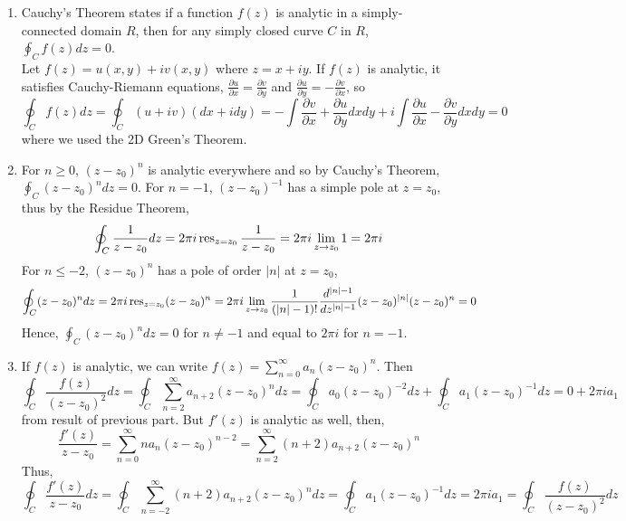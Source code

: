 \documentclass[a4paper]{article}
\begin{document}
\begin{ans}\leavevmode
\begin{enumerate}[label=(\roman*)]
\item Cauchy's Theorem states if a function $f(z)$ is analytic in a simply-connected domain $R$, then for any simply closed curve $C$ in $R$, $\oint_Cf(z)dz=0$.\\[5pt]
Let $f(z)=u(x,y)+iv(x,y)$ where $z=x+iy$. If $f(z)$ is analytic, it satisfies Cauchy-Riemann equations, $\frac{\partial u}{\partial x}=\frac{\partial v}{\partial y}$ and $\frac{\partial u}{\partial y}=-\frac{\partial v}{\partial x}$, so
$$\oint_Cf(z)dz=\oint_C(u+iv)(dx+idy)=-\int\frac{\partial v}{\partial x}+\frac{\partial u}{\partial y}dxdy+i\int\frac{\partial u}{\partial x}-\frac{\partial v}{\partial y}dxdy=0$$
where we used the 2D Green's Theorem.
\item For $n\geq0$, $(z-z_0)^n$ is analytic everywhere and so by Cauchy's Theorem, $\oint_C(z-z_0)^ndz=0$. For $n=-1$, $(z-z_0)^{-1}$ has a simple pole at $z=z_0$, thus by the Residue Theorem,
$$\oint_C\frac{1}{z-z_0}dz=2\pi i\operatorname{res}_{z=z_0}\frac{1}{z-z_0}=2\pi i\lim_{z\rightarrow z_0}1=2\pi i$$
For $n\leq -2$, $(z-z_0)^n$ has a pole of order $|n|$ at $z=z_0$,
$$\oint_C(z-z_0)^ndz=2\pi i\operatorname{res}_{z=z_0}(z-z_0)^n=2\pi i\lim_{z\rightarrow z_0}\frac{1}{(|n|-1)!}\frac{d^{|n|-1}}{dz^{|n|-1}}(z-z_0)^{|n|}(z-z_0)^n=0$$
Hence, $\oint_C(z-z_0)^ndz=0$ for $n\neq -1$ and equal to $2\pi i$ for $n=-1$.
\item If $f(z)$ is analytic, we can write $f(z)=\sum_{n=0}^\infty a_n(z-z_0)^n$. Then
$$\oint_C\frac{f(z)}{(z-z_0)^2}dz=\oint_C\sum_{n=2}^\infty a_{n+2}(z-z_0)^ndz=\oint_Ca_0(z-z_0)^{-2}dz+\oint_Ca_1(z-z_0)^{-1}dz=0+2\pi ia_1$$
from result of previous part. But $f'(z)$ is analytic as well, then,
$$\frac{f'(z)}{z-z_0}=\sum_{n=0}^\infty na_n(z-z_0)^{n-2}=\sum_{n=2}^\infty (n+2)a_{n+2}(z-z_0)^n$$
Thus,
$$\oint_C\frac{f'(z)}{z-z_0}dz=\oint_C\sum_{n=-2}^\infty(n+2)a_{n+2}(z-z_0)^ndz=\oint_Ca_1(z-z_0)^{-1}dz=2\pi ia_1=\oint_C\frac{f(z)}{(z-z_0)^2}dz$$
\end{enumerate}
\end{ans}
\newpage
\end{document}
